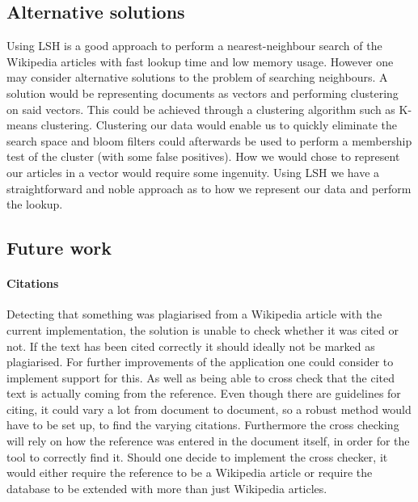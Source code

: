 \subsection{Alternative solutions}
Using LSH is a good approach to perform a nearest-neighbour search of the Wikipedia articles with fast lookup time and low memory usage. However one may consider alternative solutions to the problem of searching neighbours. A solution would be representing documents as vectors and performing clustering on said vectors. This could be achieved through a clustering algorithm such as K-means clustering. Clustering our data would enable us to quickly eliminate the search space and bloom filters could afterwards be used to perform a membership test of the cluster (with some false positives). How we would chose to represent our articles in a vector would require some ingenuity. Using LSH we have a straightforward and noble approach as to how we represent our data and perform the lookup.


\subsection{Future work}
\paragraph{Citations}
Detecting that something was plagiarised from a Wikipedia article with the current implementation, the solution is unable to check whether it was cited or not. If the text has been cited correctly it should ideally not be marked as plagiarised. For further improvements of the application one could consider to implement support for this. As well as being able to cross check that the cited text is actually coming from the reference. Even though there are guidelines for citing, it could vary a lot from document to document, so a robust method would have to be set up, to find the varying citations. Furthermore the cross checking will rely on how the reference was entered in the document itself, in order for the tool to correctly find it. Should one decide to implement the cross checker, it would either require the reference to be a Wikipedia article or require the database to be extended with more than just Wikipedia articles.

